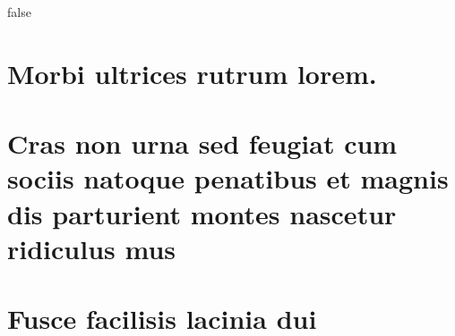 \documentclass[
	12pt,				%
	openright,		nsubseteq	%
	twoside,			%
	a4paper,			%
	english,			%
	french,				%
	spanish,			%
	brazil				%
	]{abntex2}
\begin{document}

\if false
\begin{anexosenv}

\partanexos

\chapter{Morbi ultrices rutrum lorem.}
\lipsum[30]

\chapter{Cras non urna sed feugiat cum sociis natoque penatibus et magnis dis
parturient montes nascetur ridiculus mus}

\lipsum[31]

\chapter{Fusce facilisis lacinia dui}

\lipsum[32]

\end{anexosenv}

\fi
\printindex
\end{document}
